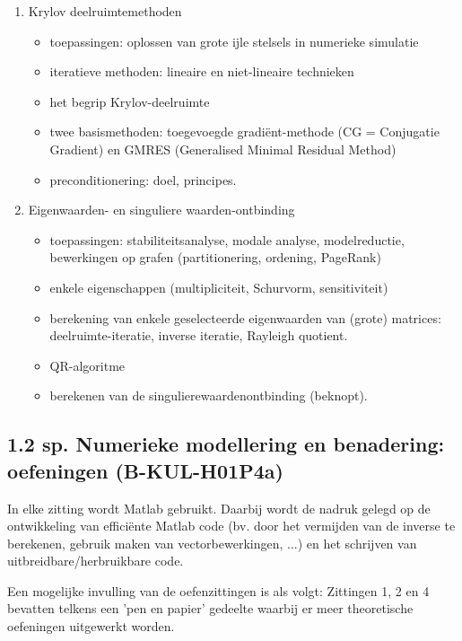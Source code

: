 \begin{enumerate}
	\item Krylov deelruimtemethoden
	      \begin{itemize}
		      \item toepassingen: oplossen van grote ijle stelsels  in numerieke simulatie
		      \item iteratieve methoden: lineaire en niet-lineaire technieken
		      \item het begrip Krylov-deelruimte
		      \item twee basismethoden: toegevoegde gradiënt-methode (CG = Conjugatie Gradient) en GMRES (Generalised Minimal Residual Method)
		      \item preconditionering: doel, principes.
	      \end{itemize}

	\item Eigenwaarden- en singuliere waarden-ontbinding
	      \begin{itemize}
		      \item toepassingen: stabiliteitsanalyse, modale analyse, modelreductie, bewerkingen op grafen (partitionering, ordening, PageRank)
		      \item enkele eigenschappen (multipliciteit, Schurvorm, sensitiviteit)
		      \item berekening van enkele geselecteerde eigenwaarden van (grote) matrices:
		            deelruimte-iteratie, inverse iteratie, Rayleigh quotient.
		      \item QR-algoritme
		      \item berekenen van de singulierewaardenontbinding (beknopt).
	      \end{itemize}
\end{enumerate}
\subsection*{1.2 sp. Numerieke modellering en benadering: oefeningen (B-KUL-H01P4a)}
In elke zitting wordt Matlab gebruikt. Daarbij wordt de nadruk gelegd op de ontwikkeling van efficiënte Matlab code (bv. door het vermijden van de inverse te berekenen, gebruik maken van vectorbewerkingen, ...) en het schrijven van uitbreidbare/herbruikbare code.

Een mogelijke invulling van de oefenzittingen is als volgt:
Zittingen 1, 2 en 4 bevatten telkens een 'pen en papier' gedeelte waarbij er meer theoretische oefeningen uitgewerkt worden.

